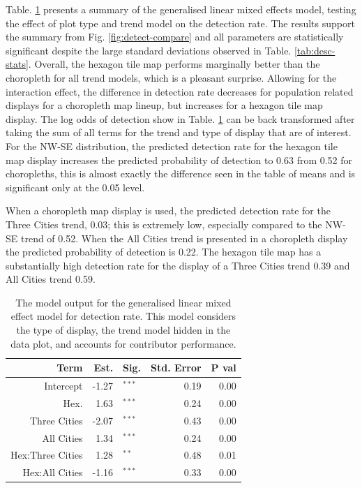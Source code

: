 \documentclass[
]{article}
\begin{document}
Table. \ref{tab:detect-glmer1} presents a summary of the generalised
linear mixed effects model, testing the effect of plot type and trend
model on the detection rate. The results support the summary from Fig.
\ref{fig:detect-compare} and all parameters are statistically
significant despite the large standard deviations observed in Table.
\ref{tab:desc-stats}. Overall, the hexagon tile map performs marginally
better than the choropleth for all trend models, which is a pleasant
surprise. Allowing for the interaction effect, the difference in
detection rate decreases for population related displays for a
choropleth map lineup, but increases for a hexagon tile map display. The
log odds of detection show in Table. \ref{tab:detect-glmer1} can be back
transformed after taking the sum of all terms for the trend and type of
display that are of interest. For the NW-SE distribution, the predicted
detection rate for the hexagon tile map display increases the predicted
probability of detection to 0.63 from 0.52 for choropleths, this is
almost exactly the difference seen in the table of means and is
significant only at the 0.05 level.

When a choropleth map display is used, the predicted detection rate for
the Three Cities trend, 0.03; this is extremely low, especially compared
to the NW-SE trend of 0.52. When the All Cities trend is presented in a
choropleth display the predicted probability of detection is 0.22. The
hexagon tile map has a substantially high detection rate for the display
of a Three Cities trend 0.39 and All Cities trend 0.59.

\begin{table}

\caption{\label{tab:detect-glmer1}The model output for the generalised linear mixed effect model for detection rate. This model considers the type of display, the trend model hidden in the data plot, and accounts for contributor performance.}
\centering
\begin{tabular}[t]{rrlrr}
\toprule
Term & Est. & Sig. & Std. Error & P val\\
\midrule
Intercept & -1.27 & $^{***}$ & 0.19 & 0.00\\
Hex. & 1.63 & $^{***}$ & 0.24 & 0.00\\
\addlinespace
Three Cities & -2.07 & $^{***}$ & 0.43 & 0.00\\
All Cities & 1.34 & $^{***}$ & 0.24 & 0.00\\
\addlinespace
Hex:Three Cities & 1.28 & $^{**}$ & 0.48 & 0.01\\
Hex:All Cities & -1.16 & $^{***}$ & 0.33 & 0.00\\
\bottomrule
\end{tabular}
\end{table}
\end{document}
